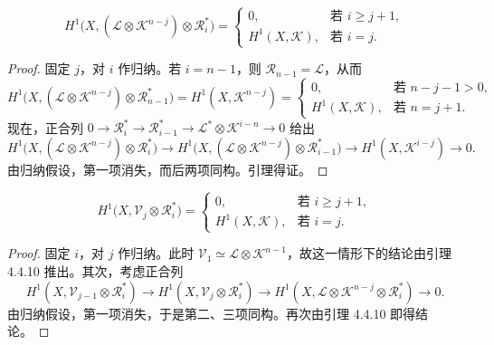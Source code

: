 
\begin{lemma}
\[
H^1\bigl(X,(\mathcal{L}\otimes\mathcal{K}^{n-j})\otimes\mathcal{R}_i^*\bigr)=
\begin{cases}
0, & \text{若 } i\ge j+1,\\
H^1(X,\mathcal{K}), & \text{若 } i=j.
\end{cases}
\]
\end{lemma}

\begin{proof}
固定 $j$，对 $i$ 作归纳。若 $i=n-1$，则 $\mathcal{R}_{n-1}=\mathcal{L}$，从而
\[
H^1\bigl(X,(\mathcal{L}\otimes\mathcal{K}^{n-j})\otimes\mathcal{R}_{n-1}^*\bigr)
=H^1(X,\mathcal{K}^{n-j})=
\begin{cases}
0, & \text{若 } n-j-1>0,\\
H^1(X,\mathcal{K}), & \text{若 } n=j+1.
\end{cases}
\]
现在，正合列 $0\to\mathcal{R}_i^*\to\mathcal{R}_{i-1}^*\to\mathcal{L}^*\otimes\mathcal{K}^{i-n}\to0$ 给出
\[
H^1\bigl(X,(\mathcal{L}\otimes\mathcal{K}^{n-j})\otimes\mathcal{R}_i^*\bigr)
\longrightarrow
H^1\bigl(X,(\mathcal{L}\otimes\mathcal{K}^{n-j})\otimes\mathcal{R}_{i-1}^*\bigr)
\longrightarrow
H^1(X,\mathcal{K}^{i-j})\longrightarrow0.
\]
由归纳假设，第一项消失，而后两项同构。引理得证。
\end{proof}

\begin{lemma}
\[
H^1\bigl(X,\mathcal{V}_j\otimes\mathcal{R}_i^*\bigr)=
\begin{cases}
0, & \text{若 } i\ge j+1,\\
H^1(X,\mathcal{K}), & \text{若 } i=j.
\end{cases}
\]
\end{lemma}

\begin{proof}
固定 $i$，对 $j$ 作归纳。此时 $\mathcal{V}_1\simeq\mathcal{L}\otimes\mathcal{K}^{n-1}$，故这一情形下的结论由引理 4.4.10 推出。其次，考虑正合列
\[
H^1(X,\mathcal{V}_{j-1}\otimes\mathcal{R}_i^*)\longrightarrow
H^1(X,\mathcal{V}_j\otimes\mathcal{R}_i^*)\longrightarrow
H^1(X,\mathcal{L}\otimes\mathcal{K}^{n-j}\otimes\mathcal{R}_i^*)\longrightarrow0.
\]
由归纳假设，第一项消失，于是第二、三项同构。再次由引理 4.4.10 即得结论。
\end{proof}

